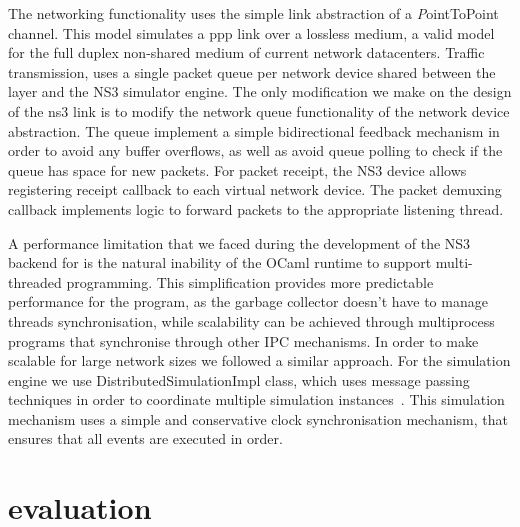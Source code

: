 
The networking functionality uses the simple link abstraction of a {\emph
  PointToPoint channel}. This model simulates a ppp link over a lossless medium,
a valid model for the full duplex non-shared medium of current network
datacenters. Traffic transmission, uses a single packet queue per network device
shared between the \mirage layer and the NS3 simulator engine.  The only
modification we make on the design of the ns3 link is to modify the network
queue functionality of the network device abstraction. The queue implement a
simple bidirectional feedback mechanism in order to avoid any buffer overflows,
as well as avoid queue polling to check if the queue has space for new packets.
For packet receipt, the NS3 device allows registering receipt callback to each
virtual network device. The packet demuxing callback implements logic to forward
packets to the appropriate listening thread.


A performance limitation that we faced during the development of the NS3 backend
for \sdnsim is the natural inability of the OCaml runtime to support
multi-threaded programming. This simplification provides more predictable
performance for the program, as the garbage collector doesn't have to manage
threads synchronisation, while scalability can be achieved through multiprocess
programs that synchronise through other IPC mechanisms. In order to make \sdnsim
scalable for large network sizes we followed a similar approach. For the
simulation engine we use DistributedSimulationImpl class, which uses message
passing techniques in order to coordinate multiple simulation
instances~\cite{Pelkey:2011ua}. This simulation mechanism uses a simple and
conservative clock synchronisation mechanism, that ensures that all events are
executed in order. 


\section{\sdnsim evaluation} \label{sec:sdnsim-precision}

